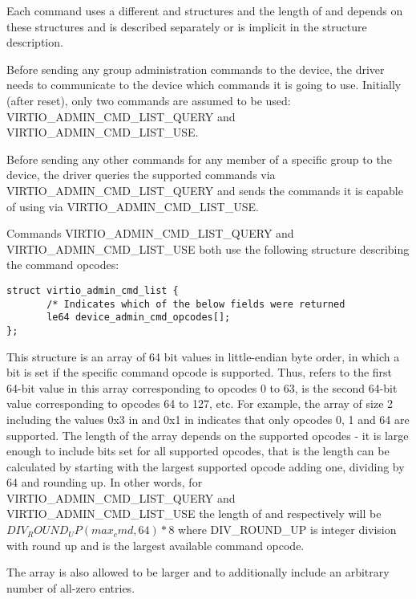 Each command uses a different  and
 structures and the length of
 and 
depends on these structures and is described separately or is
implicit in the structure description.

Before sending any group administration commands to the device, the driver
needs to communicate to the device which commands it is going to
use. Initially (after reset), only two commands are assumed to be used:
VIRTIO_ADMIN_CMD_LIST_QUERY and VIRTIO_ADMIN_CMD_LIST_USE.

Before sending any other commands for any member of a specific group to
the device, the driver queries the supported commands via
VIRTIO_ADMIN_CMD_LIST_QUERY and sends the commands it is
capable of using via VIRTIO_ADMIN_CMD_LIST_USE.

Commands VIRTIO_ADMIN_CMD_LIST_QUERY and
VIRTIO_ADMIN_CMD_LIST_USE
both use the following structure describing the
command opcodes:

\begin{lstlisting}
struct virtio_admin_cmd_list {
       /* Indicates which of the below fields were returned
       le64 device_admin_cmd_opcodes[];
};
\end{lstlisting}

This structure is an array of 64 bit values in little-endian byte
order, in which a bit is set if the specific command opcode
is supported. Thus,  refers to the
first 64-bit value in this array corresponding to opcodes 0 to
63,  is the second 64-bit value
corresponding to opcodes 64 to 127, etc.
For example, the array of size 2 including
the values 0x3 in 
and 0x1 in  indicates that only
opcodes 0, 1 and 64 are supported.
The length of the array depends on the supported opcodes - it is
large enough to include bits set for all supported opcodes,
that is the length can be calculated by starting with the largest
supported opcode adding one, dividing by 64 and rounding up.
In other words, for
VIRTIO_ADMIN_CMD_LIST_QUERY and VIRTIO_ADMIN_CMD_LIST_USE the
length of  and
 respectively will be
$DIV_ROUND_UP(max_cmd, 64) * 8$ where DIV_ROUND_UP is integer division
with round up and  is the largest available command opcode.

The array is also allowed to be larger and to additionally
include an arbitrary number of all-zero entries.


